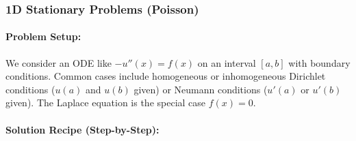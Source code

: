 \documentclass[a4paper,11pt]{report}
\begin{document}
\subsubsection{1D Stationary Problems (Poisson)}
\paragraph{Problem Setup:}
We consider an ODE like $-u''(x) = f(x)$ on an interval $[a,b]$ with boundary conditions. Common cases include homogeneous or inhomogeneous Dirichlet conditions ($u(a)$ and $u(b)$ given) or Neumann conditions ($u'(a)$ or $u'(b)$ given). The Laplace equation is the special case $f(x)=0$.
\paragraph{Solution Recipe (Step-by-Step):}
\end{document}
